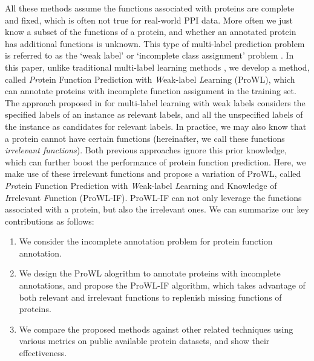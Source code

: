 \documentclass{llncs} %
\begin{document}
All these methods assume the functions associated with proteins are complete and fixed, which is often not true for real-world PPI data. More often we just know a subset of the  functions of a protein, and whether an annotated protein has additional functions is unknown. This type
of multi-label prediction problem is  referred to as the   `weak label' or `incomplete class assignment' problem \cite{bucak2011multi,sun2010multi}. In this paper, unlike traditional multi-label learning methods \cite{barutcuoglu2006hierarchical,jiang2011predicting,zhang2011framework},
we develop a method, called \textit{Pro}tein Function Prediction  with \textit{W}eak-label \textit{L}earning (ProWL), which can annotate proteins with incomplete function assignment  in the training set. The approach proposed  in \cite{bucak2011multi,sun2010multi} for multi-label learning with weak labels considers the specified labels of an instance as relevant labels, and all the unspecified labels of the instance as candidates for relevant labels. In practice, we may also know that a protein cannot have certain functions (hereinafter, we call these functions \emph{irrelevant functions}). Both previous approaches  \cite{bucak2011multi,sun2010multi} ignore
this prior knowledge, which can further boost the performance of protein function prediction. Here, we make use of these irrelevant functions and propose a variation of ProWL, called \textit{Pro}tein Function Prediction with \textit{W}eak-label \textit{L}earning and
Knowledge of \textit{I}rrelevant \textit{F}unction (ProWL-IF). ProWL-IF can not only leverage the functions associated with a protein, but also the irrelevant ones. We can summarize our key contributions as follows:
\begin{enumerate}
\item We consider the incomplete annotation problem for protein function annotation.
\item We design the ProWL alogrithm to annotate proteins with incomplete annotations, and propose the ProWL-IF algorithm, which takes advantage of both relevant and irrelevant functions to replenish missing functions of proteins.
\item We compare the proposed methods against other related techniques using various metrics on public available protein datasets, and show their effectiveness.
\end{enumerate}

\begin{comment}
The rest of the paper is organized as follows. In Section \ref{relatedwork}, we review related works on multi-label learning with weak label. In Section \ref{problemformulation}, we introduce the ProWL and its variation ProWL-IF. Section \ref{expsetup} details the experimental protocol and Section \ref{expanalysis} discusses the empirical results. In Section \ref{conclusion}, we provide conclusions with directions for future works.
\end{comment}
\end{document}
